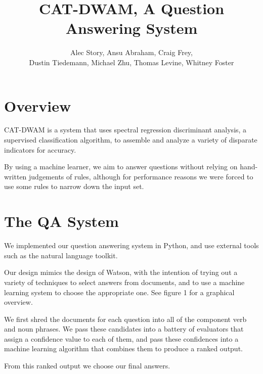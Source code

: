 \documentclass{article}
\title{CAT-DWAM, A Question Answering System}
\author{
Alec Story,
Ansu Abraham,
Craig Frey,\\
Dustin Tiedemann,
Michael Zhu,
Thomas Levine,
Whitney Foster\\
}
\begin{document}
\maketitle

\section{Overview}

CAT-DWAM is a system that uses spectral regression discriminant analysis, a
supervised classification algorithm, to assemble and analyze a variety of
disparate indicators for accuracy.

By using a machine learner, we aim to answer questions without relying on
hand-written judgements of rules, although for performance reasons we were
forced to use some rules to narrow down the input set.


\section{The QA System}

We implemented our question answering system in Python, and use external
tools such as the natural language toolkit.

Our design mimics the design of Watson, with the intention of trying out a
variety of techniques to select answers from documents, and to use a machine
learning system to choose the appropriate one.  See figure 1 for a graphical
overview.

We first shred the documents for each question into all of the component verb
and noun phrases.  We pass these candidates into a battery of evaluators that
assign a confidence value to each of them, and pass these confidences into a
machine learning algorithm that combines them to produce a ranked output.

From this ranked output we choose our final answers.
\end{document}
